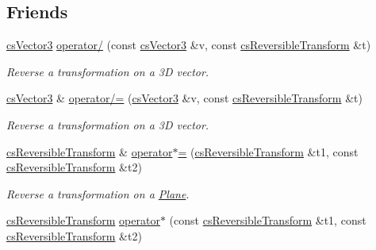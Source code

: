 \subsection*{Friends}
\begin{DoxyCompactItemize}
\item 
\hyperlink{classcsVector3}{cs\+Vector3} \hyperlink{classcsReversibleTransform_af7f65049e697c557c82c21ecd92097e2}{operator/} (const \hyperlink{classcsVector3}{cs\+Vector3} \&v, const \hyperlink{classcsReversibleTransform}{cs\+Reversible\+Transform} \&t)\hypertarget{classcsReversibleTransform_af7f65049e697c557c82c21ecd92097e2}{}\label{classcsReversibleTransform_af7f65049e697c557c82c21ecd92097e2}

\begin{DoxyCompactList}\small\item\em Reverse a transformation on a 3D vector. \end{DoxyCompactList}\item 
\hyperlink{classcsVector3}{cs\+Vector3} \& \hyperlink{classcsReversibleTransform_a6151843d11cd0c1cf381013acb7b990d}{operator/=} (\hyperlink{classcsVector3}{cs\+Vector3} \&v, const \hyperlink{classcsReversibleTransform}{cs\+Reversible\+Transform} \&t)\hypertarget{classcsReversibleTransform_a6151843d11cd0c1cf381013acb7b990d}{}\label{classcsReversibleTransform_a6151843d11cd0c1cf381013acb7b990d}

\begin{DoxyCompactList}\small\item\em Reverse a transformation on a 3D vector. \end{DoxyCompactList}\item 
\hyperlink{classcsReversibleTransform}{cs\+Reversible\+Transform} \& \hyperlink{classcsReversibleTransform_a506b68248f2d1bf11a062c908b05d5c8}{operator$\ast$=} (\hyperlink{classcsReversibleTransform}{cs\+Reversible\+Transform} \&t1, const \hyperlink{classcsReversibleTransform}{cs\+Reversible\+Transform} \&t2)
\begin{DoxyCompactList}\small\item\em Reverse a transformation on a \hyperlink{classPlane}{Plane}. \end{DoxyCompactList}\item 
\hyperlink{classcsReversibleTransform}{cs\+Reversible\+Transform} \hyperlink{classcsReversibleTransform_ae76a19c7d0d0933b3bf909f6896e5d95}{operator$\ast$} (const \hyperlink{classcsReversibleTransform}{cs\+Reversible\+Transform} \&t1, const \hyperlink{classcsReversibleTransform}{cs\+Reversible\+Transform} \&t2)\hypertarget{classcsReversibleTransform_ae76a19c7d0d0933b3bf909f6896e5d95}{}\label{classcsReversibleTransform_ae76a19c7d0d0933b3bf909f6896e5d95}


\end{DoxyCompactItemize}
